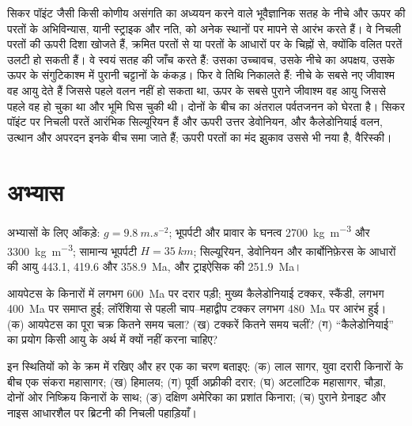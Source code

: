 \begin{inthefield}[एक कोणीय असंगति को पढ़ना]
सिकर पॉइंट जैसी किसी कोणीय असंगति का अध्ययन करने वाले भूवैज्ञानिक सतह के नीचे और ऊपर की परतों के
अभिविन्यास, यानी स्ट्राइक और नति, को अनेक स्थानों पर मापने से आरंभ करते हैं। वे
निचली परतों की ऊपरी दिशा खोजते हैं, क्रमित परतों से या परतों के आधारों पर के चिह्नों से,
क्योंकि वलित परतें उलटी हो सकती हैं। वे स्वयं सतह की जाँच करते हैं: उसका उच्चावच, उसके नीचे का
अपक्षय, उसके ऊपर के संगुटिकाश्म में पुरानी चट्टानों के कंकड़। फिर वे
तिथि निकालते हैं: नीचे के सबसे नए जीवाश्म वह आयु देते हैं जिससे पहले वलन नहीं हो सकता था,
ऊपर के सबसे पुराने जीवाश्म वह आयु जिससे पहले वह हो चुका था और भूमि घिस
चुकी थी। दोनों के बीच का अंतराल पर्वतजनन को घेरता है। सिकर पॉइंट पर निचली परतें आरंभिक
सिल्यूरियन हैं और ऊपरी उत्तर डेवोनियन, और कैलेडोनियाई वलन, उत्थान और अपरदन इनके
बीच समा जाते हैं; ऊपरी परतों का मंद झुकाव उससे भी नया है, वैरिस्की।
\end{inthefield}

\section*{अभ्यास}\label{sec:b2:wilson-cycle:exercises}

अभ्यासों के लिए आँकड़े: $g = \qty{9.8}{m.s^{-2}}$; भूपर्पटी और प्रावार के घनत्व
\qty{2700}{kg.m^{-3}} और \qty{3300}{kg.m^{-3}}; सामान्य भूपर्पटी $H = \qty{35}{km}$; सिल्यूरियन, डेवोनियन और
कार्बोनिफ़ेरस के आधारों की आयु 443.1, 419.6 और \qty{358.9}{Ma}, और
ट्राइऐसिक की \qty{251.9}{Ma}।

\begin{exercise}[$\star$]\label{exo:b2:wilson-cycle:1}
आयपेटस के किनारों में लगभग \qty{600}{Ma} पर दरार पड़ी; मुख्य कैलेडोनियाई टक्कर,
स्कैंडी, लगभग \qty{400}{Ma} पर समाप्त हुई; लॉरेंशिया से पहली चाप--महाद्वीप टक्कर लगभग
\qty{480}{Ma} पर आरंभ हुई। (क) आयपेटस का पूरा चक्र कितने समय चला? (ख) टक्करें
कितने समय चलीं? (ग) ``कैलेडोनियाई'' का प्रयोग किसी आयु के अर्थ में क्यों नहीं करना चाहिए?
\end{exercise}

\begin{exercise}[$\star$]\label{exo:b2:wilson-cycle:2}
इन स्थितियों को  के क्रम में रखिए और हर एक का चरण बताइए: (क)
लाल सागर, युवा दरारी किनारों के बीच एक संकरा महासागर; (ख) हिमालय; (ग) पूर्वी अफ़्रीकी
दरार; (घ) अटलांटिक महासागर, चौड़ा, दोनों ओर निष्क्रिय किनारों के साथ; (ङ) दक्षिण अमेरिका का
प्रशांत किनारा; (च) पुराने ग्रेनाइट और नाइस आधारशैल पर ब्रिटनी की निचली पहाड़ियाँ।
\end{exercise}

